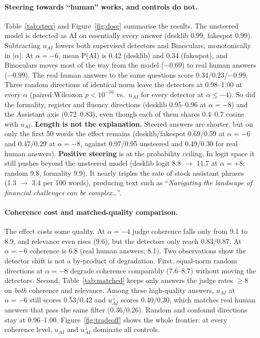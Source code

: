 \paragraph{Steering towards ``human'' works, and controls do not.} Table~\ref{tab:steer} and Figure~\ref{fig:dose} summarise the results. The unsteered model is detected as AI on essentially every answer (desklib 0.99, fakespot 0.99). Subtracting $u_{AI}$ lowers both supervised detectors and Binoculars, monotonically in $|\alpha|$. At $\alpha{=}{-}6$, mean P(AI) is 0.42 (desklib) and 0.34 (fakespot), and Binoculars moves most of the way from the model ($-0.69$) to real human answers ($-0.99$). The real human answers to the same questions score 0.34/0.23/$-0.99$. Three random directions of identical norm leave the detectors at 0.98--1.00 at every $\alpha$ (paired Wilcoxon $p<10^{-16}$ vs.\ $u_{AI}$ for every detector at $\alpha\leq{-}4$). So did the formality, register and fluency directions (desklib 0.95--0.96 at $\alpha{=}{-}8$) and the Assistant axis (0.72--0.83), even though each of them shares 0.4--0.7 cosine with $u_{AI}$.
\textbf{Length is not the explanation.} Steered answers are shorter, but on only the first 50 words the effect remains (desklib/fakespot 0.69/0.59 at $\alpha{=}{-}6$ and 0.47/0.29 at $\alpha{=}{-}8$, against 0.97/0.95 unsteered and 0.49/0.30 for real human answers).
\textbf{Positive steering} is at the probability ceiling. In logit space it still pushes beyond the unsteered model (desklib logit 8.8 $\rightarrow$ 11.7 at $\alpha{=}{+}8$; random 9.8, formality 9.9). It nearly triples the rate of stock assistant phrases (1.3 $\rightarrow$ 3.4 per 100 words), producing text such as ``\emph{Navigating the landscape of financial challenges can be complex\ldots}''.

\paragraph{Coherence cost and matched-quality comparison.} The effect costs some quality. At $\alpha{=}{-}4$ judge coherence falls only from 9.1 to 8.9, and relevance even rises (9.6), but the detectors only reach 0.83/0.87. At $\alpha{=}{-}6$ coherence is 6.8 (real human answers: 8.1). Two observations show the detector shift is not a by-product of degradation. First, equal-norm random directions at $\alpha{=}{-}8$ degrade coherence comparably (7.6--8.7) without moving the detectors. Second, Table~\ref{tab:matched} keeps only answers the judge rates $\geq 8$ on \emph{both} coherence and relevance. Among these high-quality answers, $u_{AI}$ at $\alpha{=}{-}6$ still scores 0.53/0.42 and $u_{AI}^{\perp}$ scores 0.40/0.30, which matches real human answers that pass the same filter (0.36/0.26). Random and confound directions stay at 0.96--1.00. Figure~\ref{fig:tradeoff} shows the whole frontier: at every coherence level, $u_{AI}$ and $u_{AI}^{\perp}$ dominate all controls.

